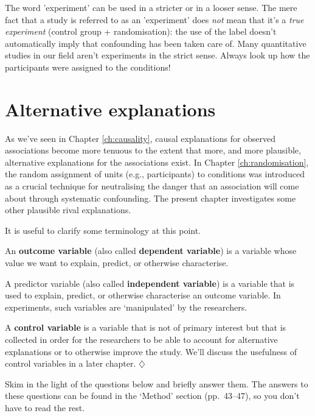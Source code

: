 \documentclass[a4paper]{tufte-book}\usepackage[]{graphicx}\usepackage[]{xcolor}
\newcommand{\term}[1]{\textbf{#1}}
\newcommand*{\parend}[1][$\diamondsuit$]{%
  \unskip\nobreak\hspace{1em plus 1fill}$\diamondsuit$%
}
\begin{document}
\begin{framed}
The word 'experiment' can be used in a stricter or in a looser sense.
The mere fact that a study is referred to as an 'experiment' does \emph{not}
mean that it's a \textit{true experiment} (control group + randomisation):
the use of the label doesn't automatically imply that confounding has been
taken care of.
Many quantitative studies in our field aren't experiments in the strict sense.
Always look up how the participants were assigned to the conditions!
\end{framed}


\chapter{Alternative explanations}\label{ch:alternative_explanations}
As we've seen in Chapter \ref{ch:causality},
causal explanations for observed associations become more tenuous to
the extent that more, and more plausible, alternative explanations for the
associations exist.
In Chapter \ref{ch:randomisation}, the random assignment of units
(e.g., participants) to conditions was introduced as a crucial technique
for neutralising the danger that an association will come about
through systematic confounding.
The present chapter investigates some other plausible rival explanations.

It is useful to clarify some terminology at this point.

\label{def:variables}
  An \term{outcome variable} (also called \term{dependent variable})
  is a variable whose value we want to explain, predict, or otherwise
  characterise.
  
  A \textrm{predictor variable} (also called \term{independent variable})
  is a variable that is used to explain, predict, or otherwise characterise
  an outcome variable. In experiments, such variables are `manipulated'
  by the researchers.
  
  A \term{control variable} is a variable that is not of primary interest
  but that is collected in order for the researchers to be able to 
  account for alternative explanations or to otherwise improve the study.
  We'll discuss the usefulness of control variables in a later chapter.
\parend

\label{ex:ludke}
Skim \citet{Ludke2014} in the light of the questions below 
and briefly answer them.
The answers to these questions can be found in the `Method' section 
(pp.~43--47), so you don't have to read the rest.
\end{document}
